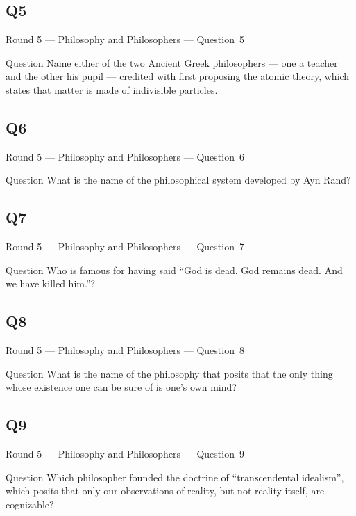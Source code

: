 \documentclass[11pt]{beamer}
\begin{document}
\subsection*{Q5}
\begin{frame}[t]{Round 5 --- Philosophy and Philosophers --- \mbox{Question 5}}
\vspace{-0.5em}
\begin{block}{Question}
Name either of the two Ancient Greek philosophers --- one a teacher and the other his pupil --- credited with first proposing the atomic theory, which states that matter is made of indivisible particles.
\end{block}
\end{frame}
\subsection*{Q6}
\begin{frame}[t]{Round 5 --- Philosophy and Philosophers --- \mbox{Question 6}}
\vspace{-0.5em}
\begin{block}{Question}
What is the name of the philosophical system developed by Ayn Rand?
\end{block}
\end{frame}
\subsection*{Q7}
\begin{frame}[t]{Round 5 --- Philosophy and Philosophers --- \mbox{Question 7}}
\vspace{-0.5em}
\begin{block}{Question}
Who is famous for having said ``God is dead. God remains dead. And we have killed him.''?
\end{block}
\end{frame}
\subsection*{Q8}
\begin{frame}[t]{Round 5 --- Philosophy and Philosophers --- \mbox{Question 8}}
\vspace{-0.5em}
\begin{block}{Question}
What is the name of the philosophy that posits that the only thing whose existence one can be sure of is one's own mind?
\end{block}
\end{frame}
\subsection*{Q9}
\begin{frame}[t]{Round 5 --- Philosophy and Philosophers --- \mbox{Question 9}}
\vspace{-0.5em}
\begin{block}{Question}
Which philosopher founded the doctrine of ``transcendental idealism'', which posits that only our observations of reality, but not reality itself, are cognizable?
\end{block}
\end{frame}
\end{document}
